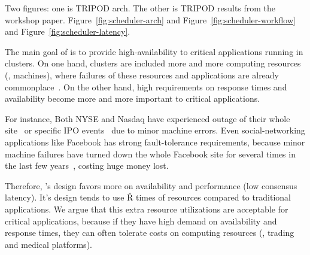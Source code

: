 Two figures: one is TRIPOD arch. The other is TRIPOD results from the workshop 
paper. Figure~\ref{fig:scheduler-arch} and Figure~\ref{fig:scheduler-workflow} 
and Figure~\ref{fig:scheduler-latency}.


 The main goal of \xxx is to 
provide high-availability to critical applications 
running in clusters. On one hand, clusters are included more and more computing 
resources (\eg, machines), where failures of these resources and applications 
are already commonplace~\cite{facebook:outage}. On the other hand, 
high requirements on response times and availability become more and more 
important to critical applications.

For instance, Both NYSE and Nasdaq have experienced outage of their whole 
site~\cite{nyse:halt} or specific IPO events~\cite{facebook:ipo:delay} due to 
minor machine errors.  Even social-networking applications like Facebook has 
strong fault-tolerance requirements, because minor machine failures have turned 
down the whole Facebook site for several times in the last few 
years~\cite{facebook:outage}, costing huge 
money lost. 

Therefore, \tripod's design favors more on availability and performance 
(low consensus latency). It's design tends to use \v{R} times of resources 
compared to traditional applications. We argue that this extra resource 
utilizations are acceptable for critical applications, because if they have 
high 
demand on availability and response times, they can often tolerate costs on 
computing resources (\eg, trading and medical platforms).

